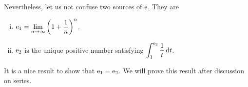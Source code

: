 Nevertheless, let us not confuse two sources of $\mathrm e$.  They are
\begin{enumerate}[(i)]
  \item $\displaystyle \mathrm e_1 = \lim_{n \to \infty} \left( 1 + \frac{1}{n} \right)^n$.

  \item $\mathrm e_2$ is the unique positive number satisfying $\displaystyle \int_1^{\mathrm e_2} \frac{1}{t} \, \mathrm d t$.
\end{enumerate}
It is a nice result to show that $\mathrm e_1 = \mathrm e_2$.
We will prove this result after discussion on series.
